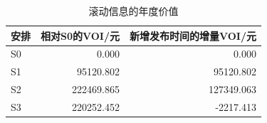 \begin{table}[H]
\centering\small
\caption{滚动信息的年度价值}
\label{tab:q3-voi}
\begin{tabular}{lrr}
\toprule
安排 & 相对S0的VOI/元 & 新增发布时间的增量VOI/元 \\
\midrule
S0 & 0.000 & 0.000 \\
S1 & 95120.802 & 95120.802 \\
S2 & 222469.865 & 127349.063 \\
S3 & 220252.452 & -2217.413 \\
\bottomrule
\end{tabular}
\end{table}
